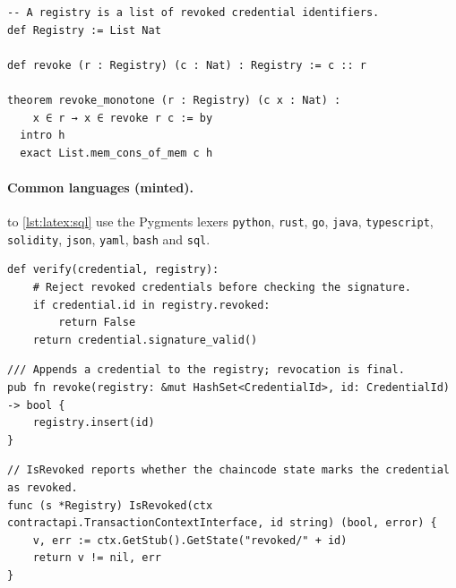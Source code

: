 \begin{lstlisting}[style=lean, float=tbp, caption={Lean 4: the registry only grows (\cref{inv:latex:monotone}).}, label={lst:latex:lean}]
-- A registry is a list of revoked credential identifiers.
def Registry := List Nat

def revoke (r : Registry) (c : Nat) : Registry := c :: r

theorem revoke_monotone (r : Registry) (c x : Nat) :
    x ∈ r → x ∈ revoke r c := by
  intro h
  exact List.mem_cons_of_mem c h
\end{lstlisting}

\FloatBarrier
\paragraph{Common languages (minted).}
 to \cref{lst:latex:sql} use the Pygments lexers \texttt{python}, \texttt{rust}, \texttt{go}, \texttt{java}, \texttt{typescript}, \texttt{solidity}, \texttt{json}, \texttt{yaml}, \texttt{bash} and \texttt{sql}.
\begin{listing}[!ht]
\begin{verbatim}
def verify(credential, registry):
    # Reject revoked credentials before checking the signature.
    if credential.id in registry.revoked:
        return False
    return credential.signature_valid()
\end{verbatim}
\caption{Python.}\label{lst:latex:verify}
\end{listing}

\begin{listing}[!ht]
\begin{verbatim}
/// Appends a credential to the registry; revocation is final.
pub fn revoke(registry: &mut HashSet<CredentialId>, id: CredentialId) -> bool {
    registry.insert(id)
}
\end{verbatim}
\caption{Rust.}\label{lst:latex:rust}
\end{listing}

\begin{listing}[!ht]
\begin{verbatim}
// IsRevoked reports whether the chaincode state marks the credential as revoked.
func (s *Registry) IsRevoked(ctx contractapi.TransactionContextInterface, id string) (bool, error) {
	v, err := ctx.GetStub().GetState("revoked/" + id)
	return v != nil, err
}
\end{verbatim}
\caption{Go (a Hyperledger Fabric chaincode function).}\label{lst:latex:go}
\end{listing}

